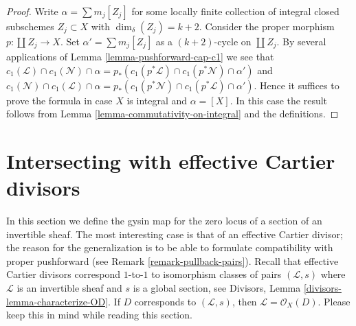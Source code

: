 \begin{proof}
Write $\alpha = \sum m_j[Z_j]$ for some locally finite
collection of integral closed subschemes $Z_j \subset X$
with $\dim_\delta(Z_j) = k + 2$.
Consider the proper morphism $p : \coprod Z_j \to X$.
Set $\alpha' = \sum m_j[Z_j]$ as a $(k + 2)$-cycle on
$\coprod Z_j$. By several applications of
Lemma \ref{lemma-pushforward-cap-c1} we see that
$c_1(\mathcal{L}) \cap c_1(\mathcal{N}) \cap \alpha
= p_*(c_1(p^*\mathcal{L}) \cap c_1(p^*\mathcal{N}) \cap \alpha')$
and
$c_1(\mathcal{N}) \cap c_1(\mathcal{L}) \cap \alpha
= p_*(c_1(p^*\mathcal{N}) \cap c_1(p^*\mathcal{L}) \cap \alpha')$.
Hence it suffices to prove the formula in case $X$ is integral
and $\alpha = [X]$. In this case the result follows
from Lemma \ref{lemma-commutativity-on-integral} and the definitions.
\end{proof}




\section{Intersecting with effective Cartier divisors}
\label{section-intersecting-effective-Cartier}

\noindent
In this section we define the gysin map for the zero locus of a
section of an invertible sheaf. The most interesting case is that
of an effective Cartier divisor; the reason for the generalization
is to be able to formulate compatibility with proper pushforward
(see Remark \ref{remark-pullback-pairs}).
Recall that effective Cartier divisors correspond $1$-to-$1$ to
isomorphism classes of pairs $(\mathcal{L}, s)$ where $\mathcal{L}$
is an invertible sheaf and $s$ is a global section, see
Divisors, Lemma \ref{divisors-lemma-characterize-OD}.
If $D$ corresponds to $(\mathcal{L}, s)$, then
$\mathcal{L} = \mathcal{O}_X(D)$. Please keep this in mind while
reading this section.

